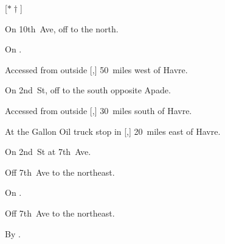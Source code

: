 
[$\ast\dagger$]

\begin{LocationList}

On 10th~Ave, off  to the north.

On .

Accessed from  outside [,] 50~miles west of Havre.

On 2nd~St, off  to the south opposite Apade.

Accessed from  outside [,] 30~miles south of Havre.

At the Gallon Oil truck stop in [,] 20~miles east of Havre.

On 2nd~St at  7th~Ave.

Off  7th~Ave to the northeast.

\Location{\RecruitmentAgency \Recruitment}
On .

Off  7th~Ave to the northeast.

By .

\end{LocationList}
